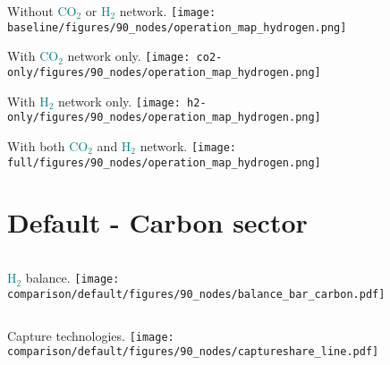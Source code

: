 \documentclass[12pt, aspectratio=169]{beamer}
\newcommand{\carbon}{\textcolor{teal}{CO$_2$}}
\newcommand{\hydrogen}{\textcolor{teal}{H$_2$}}
\begin{document}
\begin{frame}
    \begin{center}
    Without \carbon{} or \hydrogen{} network.
    \texttt{[image: baseline/figures/90\_nodes/operation\_map\_hydrogen.png]}
    \end{center}
\end{frame}


\begin{frame}
    \begin{center}
    With \carbon{} network only.
    \texttt{[image: co2-only/figures/90\_nodes/operation\_map\_hydrogen.png]}
    \end{center}
\end{frame}

\begin{frame}
    \begin{center}
    With \hydrogen{} network only.
    \texttt{[image: h2-only/figures/90\_nodes/operation\_map\_hydrogen.png]}
    \end{center}
\end{frame}


\begin{frame}
    \begin{center}
    With both \carbon{}  and \hydrogen{} network.
    \texttt{[image: full/figures/90\_nodes/operation\_map\_hydrogen.png]}
    \end{center}
\end{frame}






\section*{Default - Carbon sector}

\begin{frame}
    \begin{columns}
        \hydrogen{} balance.
        \texttt{[image: comparison/default/figures/90\_nodes/balance\_bar\_carbon.pdf]}
    \end{columns}
\end{frame}

\begin{frame}
    \begin{columns}
        Capture technologies.
        \texttt{[image: comparison/default/figures/90\_nodes/captureshare\_line.pdf]}
    \end{columns}
\end{frame}
\end{document}
